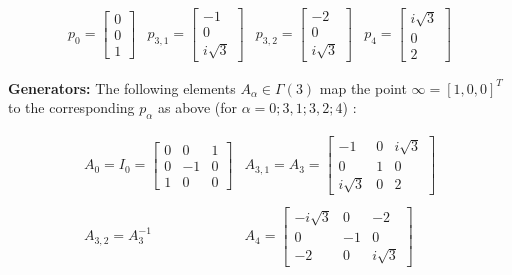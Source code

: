 \documentclass{article}[12pt]
\begin{document}
$$
\begin{array}{cccc} p_0=\left[ \begin{array}{c} 0 \\ 0 \\ 1 \end{array}\right] & 
  p_{3,1}=\left[ \begin{array}{c} -1 \\ 0 \\ i\sqrt{3} \end{array}\right] &
  
  p_{3,2}=\left[ \begin{array}{c} -2 \\ 0 \\ i\sqrt{3} \end{array}\right]  &
  p_{4}=\left[ \begin{array}{c} i\sqrt{3} \\ 0 \\ 2  \end{array}\right] 
  \end{array}
$$


{\bf Generators:} The following elements $A_\alpha \in \Gamma(3)$ map the point $\infty=[1,0,0]^T$ to the corresponding $p_\alpha$ as above (for $\alpha=0; 3,1; 3,2; 4$) :

$$
\begin{array}{cc} A_0=I_0=\left[ \begin{array}{ccc} 0 & 0 & 1 \\ 0 & -1 & 0 \\ 1 & 0 & 0 \end{array}\right] & 
  A_{3,1}=A_3=\left[ \begin{array}{ccc} -1 & 0 & i\sqrt{3} \\ 0 & 1 & 0 \\ i\sqrt{3} & 0 & 2 \end{array}\right] \\
  \\
  A_{3,2}=A_3^{-1} %
  &  A_{4}=\left[ \begin{array}{ccc} -i\sqrt{3} & 0 & -2\\ 0 & -1 & 0 \\ -2 & 0 & i\sqrt{3}  \end{array}\right] 
  \end{array}
$$
\end{document}
